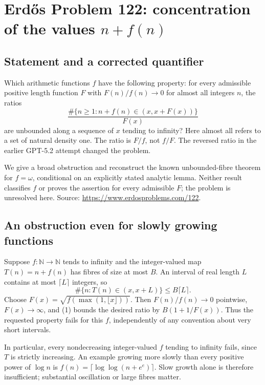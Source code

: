 \section*{Erd\H{o}s Problem 122: concentration of the values $n+f(n)$}
\subsection*{Statement and a corrected quantifier}
Which arithmetic functions $f$ have the following property: for every admissible positive length function $F$ with $F(n)/f(n)\to0$ for almost all integers $n$, the ratios
\[
 \frac{\#\{n\ge1:n+f(n)\in(x,x+F(x))\}}{F(x)}
\]
are unbounded along a sequence of $x$ tending to infinity? Here almost all refers to a set of natural density one. The ratio is $F/f$, not $f/F$. The reversed ratio in the earlier GPT-5.2 attempt changed the problem.

We give a broad obstruction and reconstruct the known unbounded-fibre theorem for $f=\omega$, conditional on an explicitly stated analytic lemma. Neither result classifies $f$ or proves the assertion for every admissible $F$; the problem is unresolved here. Source: \url{https://www.erdosproblems.com/122}.

\subsection*{An obstruction even for slowly growing functions}
Suppose $f:\mathbb N\to\mathbb N$ tends to infinity and the integer-valued map $T(n)=n+f(n)$ has fibres of size at most $B$. An interval of real length $L$ contains at most $\lceil L\rceil$ integers, so
\[
 \#\{n:T(n)\in(x,x+L)\}\le B\lceil L\rceil. \tag{1}
\]
Choose $F(x)=\sqrt{f(\max(1,\lfloor x\rfloor))}$. Then $F(n)/f(n)\to0$ pointwise, $F(x)\to\infty$, and (1) bounds the desired ratio by $B(1+1/F(x))$. Thus the requested property fails for this $f$, independently of any convention about very short intervals.

In particular, every nondecreasing integer-valued $f$ tending to infinity fails, since $T$ is strictly increasing. An example growing more slowly than every positive power of $\log n$ is
$f(n)=\lceil\log\log(n+e^e)\rceil$. Slow growth alone is therefore insufficient; substantial oscillation or large fibres matter.

